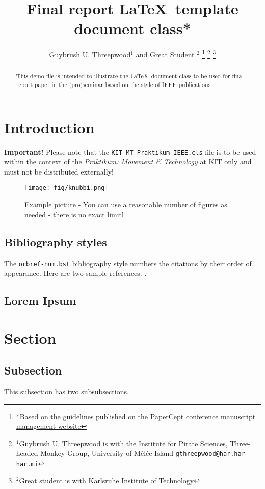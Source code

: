 \documentclass[a4paper, 10pt, journal]{KIT-HCR-Report-IEEE}      %
\title{\LARGE \bf
Final report  \LaTeX\ template document class*
}
\author{Guybrush U. Threepwood$^{1}$ and Great Student $^{2}$%
\thanks{*Based on the guidelines published on the \href{http://conf.papercept.net/conferences/support/tex.php}{PaperCept conference manuscript management website}}%
\thanks{$^{1}$Guybrush U. Threepwood is with the Institute for Pirate Sciences, Three-headed Monkey Group, University of  M\^el\'ee Island
        {\tt\small gthreepwood@har.har-har.mi}}%
\thanks{$^{2}$Great student is with Karlsruhe Institute of Technology}%
}
\begin{document}
\maketitle

\begin{abstract}

This demo file is intended to illustrate the \LaTeX\ document class to be used for final report paper in the (pro)seminar based on the style of IEEE publications. 

\end{abstract}

\section{Introduction}
{\bf Important!} Please note that the \verb!KIT-MT-Praktikum-IEEE.cls! file is to be used within the context of the {\it Praktikum: Movement \& Technology} at KIT only and must not be distributed externally!

\begin{figure}[h]
   \centering
   \texttt{[image: fig/knubbi.png]}
   \caption{Example picture - You can use a reasonable number of figures as needed -  there is no exact limitl}
   \label{fig:knubbi}
\end{figure}

\subsection{Bibliography styles}
The \texttt{orbref-num.bst} bibliography style numbers the citations by their order of appearance. Here are two sample references: \cite{Newton1687,Mombaur2009}.

\subsection{Lorem Ipsum}
\lipsum[1]


\section{Section}
\subsection{Subsection}
This subsection has two subsubsections.
\end{document}

